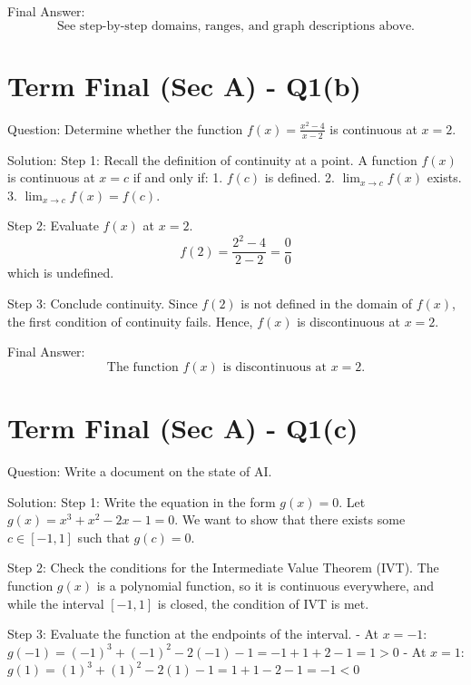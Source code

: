 \documentclass[11pt, a4paper]{article}
\begin{document}
Final Answer:
$$
\boxed{\text{See step-by-step domains, ranges, and graph descriptions above.}}
$$


\section*{Term Final (Sec A) - Q1(b)}
Question:
Determine whether the function $f(x) = \frac{x^2-4}{x-2}$ is continuous at $x = 2$.

Solution:
Step 1: Recall the definition of continuity at a point.
A function $f(x)$ is continuous at $x = c$ if and only if:
1. $f(c)$ is defined.
2. $\lim_{x \to c} f(x)$ exists.
3. $\lim_{x \to c} f(x) = f(c)$.

Step 2: Evaluate $f(x)$ at $x = 2$.
$$f(2) = \frac{2^2-4}{2-2} = \frac{0}{0}$$
which is undefined.

Step 3: Conclude continuity.
Since $f(2)$ is not defined in the domain of $f(x)$, the first condition of continuity fails. Hence, $f(x)$ is discontinuous at $x = 2$.

Final Answer:
$$
\boxed{\text{The function } f(x) \text{ is discontinuous at } x = 2.}
$$


\section*{Term Final (Sec A) - Q1(c)}
Question:
Write a document on the state of AI.

Solution:
Step 1: Write the equation in the form $g(x) = 0$. Let $g(x) = x^3 + x^2 - 2x - 1 = 0$. We want to show that there exists some $c \in [-1, 1]$ such that $g(c) = 0$.

Step 2: Check the conditions for the Intermediate Value Theorem (IVT). The function $g(x)$ is a polynomial function, so it is continuous everywhere, and while the interval $[-1, 1]$ is closed, the condition of IVT is met.

Step 3: Evaluate the function at the endpoints of the interval.
- At $x = -1$: $g(-1) = (-1)^3 + (-1)^2 - 2(-1) - 1 = -1 + 1 + 2 - 1 = 1 > 0$
- At $x = 1$: $g(1) = (1)^3 + (1)^2 - 2(1) - 1 = 1 + 1 - 2 - 1 = -1 < 0$
\end{document}
